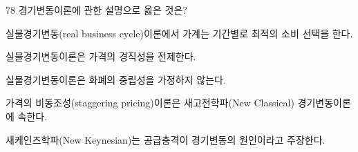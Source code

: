 \begin{question}{78}
경기변동이론에 관한 설명으로 옳은 것은?
\begin{choices}
  \item 실물경기변동(real business cycle)이론에서 가계는 기간별로 최적의 소비 선택을 한다.
  \item 실물경기변동이론은 가격의 경직성을 전제한다.
  \item 실물경기변동이론은 화폐의 중립성을 가정하지 않는다.
  \item 가격의 비동조성(staggering pricing)이론은 새고전학파(New Classical) 경기변동이론에 속한다.
  \item 새케인즈학파(New Keynesian)는 공급충격이 경기변동의 원인이라고 주장한다.
\end{choices}
\end{question}

